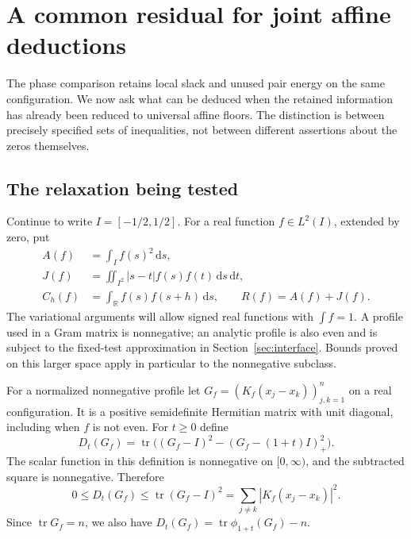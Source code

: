 \documentclass[11pt,reqno]{amsart}
\numberwithin{equation}{section}
\newcommand{\R}{\mathbb R}
\newcommand{\tr}{\operatorname{tr}}
\newcommand{\dd}{\,\mathrm d}
\begin{document}
\section{A common residual for joint affine deductions}
\label{sec:structural}

The phase comparison retains local slack and unused pair energy
on the same configuration.
We now ask what can be deduced when the retained information has
already been reduced to universal affine floors. The distinction is
between precisely specified sets of inequalities, not between
different assertions about the zeros themselves.

\subsection{The relaxation being tested}

Continue to write $I=[-1/2,1/2]$. For a real function $f\in L^2(I)$,
extended by zero, put
\begin{equation}
 \begin{split}
 A(f)&=\int_I f(s)^2\dd s,\\
 J(f)&=\iint_{I^2}|s-t|f(s)f(t)\dd s\dd t,\\
 C_h(f)&=\int_{\R}f(s)f(s+h)\dd s,\qquad R(f)=A(f)+J(f).
 \end{split}
 \label{eq:structural-forms}
\end{equation}
The variational arguments will allow signed real functions with
$\int f=1$. A profile used in a Gram matrix is nonnegative; an analytic
profile is also even and is subject to the fixed-test approximation in
Section~\ref{sec:interface}. Bounds proved on this larger space
apply in particular to the nonnegative subclass.

For a normalized nonnegative profile let
$G_f=(K_f(x_j-x_k))_{j,k=1}^n$ on a real configuration.
It is a positive semidefinite Hermitian matrix with unit diagonal,
including when $f$ is not even. For $t\ge0$ define
\begin{equation}
 D_t(G_f)=
 \tr\bigl((G_f-I)^2-(G_f-(1+t)I)_+^2\bigr).
 \label{eq:structural-defect}
\end{equation}
The scalar function in this definition is nonnegative on $[0,\infty)$,
and the subtracted square is nonnegative. Therefore
\begin{equation}
 0\le D_t(G_f)\le\tr(G_f-I)^2
 =\sum_{j\ne k}|K_f(x_j-x_k)|^2.
 \label{eq:defect-frobenius}
\end{equation}
Since $\tr G_f=n$, we also have
$D_t(G_f)=\tr\phi_{1+t}(G_f)-n$.
\end{document}
